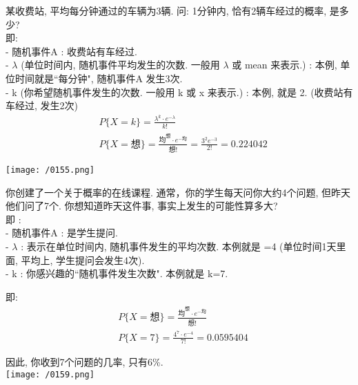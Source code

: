 \documentclass[UTF8]{ctexart}
\begin{document}
	
	
	
	\begin{myEnvSample}
		某收费站, 平均每分钟通过的车辆为3辆. 问: 1分钟内, 恰有2辆车经过的概率, 是多少? \\
		即: \\
		- 随机事件A : 收费站有车经过. \\
		- $\lambda$ (单位时间内, 随机事件平均发生的次数. 一般用 $\lambda$ 或 mean 来表示.) : 本例, 单位时间就是``每分钟", 随机事件A 发生3次. \\
		- k (你希望随机事件发生的次数. 一般用 k 或 x 来表示.) : 本例, 就是 2. (收费站有车经过, 发生2次) 
\begin{align*}  %
	&P\{X=k\}=\frac{\lambda ^k\cdot e^{-\lambda}}{k!}\\
&P\{X=\text{想\}}=\frac{\text{均}^{\text{想}}\cdot e^{-\text{均}}}{\text{想!}}=\frac{3^2e^{-3}}{2!}=0.224042
\end{align*}

	\texttt{[image: /0155.png]} 	
	\end{myEnvSample}
	\vspace{1em} 
	
	
	
	
	\begin{myEnvSample}
		你创建了一个关于概率的在线课程. 通常，你的学生每天问你大约4个问题, 但昨天他们问了7个. 你想知道昨天这件事, 事实上发生的可能性算多大? \\
		即 : \\
		- 随机事件A : 是学生提问. \\
		- $\lambda$ : 表示在单位时间内, 随机事件发生的平均次数. 本例就是 =4 (单位时间1天里面, 平均上, 学生提问会发生4次). \\
		- k : 你感兴趣的``随机事件发生次数". 本例就是 k=7. 
		
		即: 
		\begin{align*}  %
	&P\{X=\text{想\}}=\frac{\text{均}^{\text{想}}\cdot e^{-\text{均}}}{\text{想!}}\\
&P\{X=7\}=\frac{4^7\cdot e^{-4}}{7!}=0.0595404
		\end{align*}
	
	因此, 你收到7个问题的几率, 只有6\%. \\
	
	\texttt{[image: /0159.png]} 
	\end{myEnvSample}
	\vspace{1em} 
	
\end{document}
